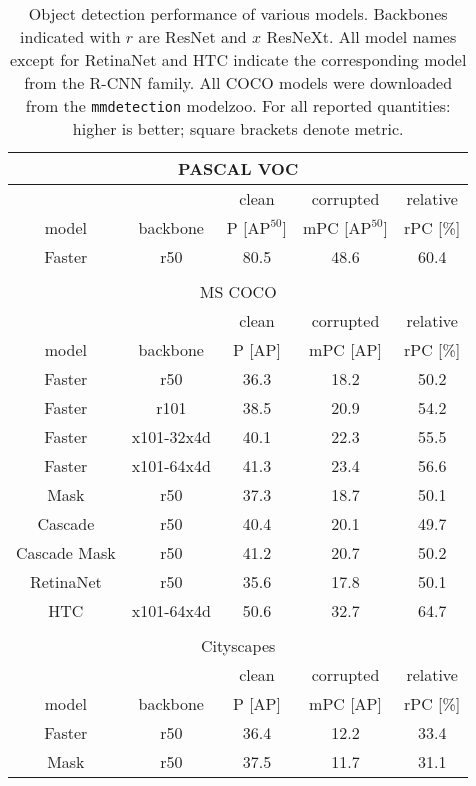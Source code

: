 \documentclass{article}
\begin{document}
\begin{table}[t!]\footnotesize
\begin{center}
\begin{tabular}{c|c|ccc}
\multicolumn{5}{c}{PASCAL VOC} \\
\toprule
\multicolumn{2}{c}{} & clean & corrupted & relative\\
model & backbone & P [$\operatorname{AP^{50}}$] & mPC [$\operatorname{AP^{50}}$]& rPC \small{[\%]}\\
\hline
Faster & r50 & 80.5 & 48.6 & 60.4\\
\bottomrule

\multicolumn{5}{c}{} \\
\multicolumn{5}{c}{MS COCO} \\
\toprule
\multicolumn{2}{c}{} & clean & corrupted & relative\\
model & backbone & P \small{[AP]} & mPC \small{[AP]} & rPC \small{[\%]}\\
\hline
Faster & r50 & 36.3 & 18.2 & 50.2\\
Faster & r101 & 38.5 & 20.9 & 54.2\\
Faster & x101-32x4d & 40.1 & 22.3 & 55.5\\
Faster & x101-64x4d & 41.3 & 23.4 & 56.6\\
\hline
Mask & r50 & 37.3 & 18.7 & 50.1\\
Cascade & r50 & 40.4 & 20.1 & 49.7\\
Cascade Mask & r50 & 41.2 & 20.7 & 50.2\\
RetinaNet & r50 & 35.6 & 17.8 & 50.1\\
HTC & x101-64x4d & 50.6 & 32.7 & 64.7\\
\bottomrule

\multicolumn{5}{c}{} \\
\multicolumn{5}{c}{Cityscapes}\\
\toprule
\multicolumn{2}{c}{} & clean & corrupted & relative\\
model & backbone & P \small{[AP]} & mPC \small{[AP]} & rPC \small{[\%]}\\
\hline
Faster & r50 & 36.4 & 12.2 & 33.4\\
Mask & r50 & 37.5 & 11.7 & 31.1\\
\bottomrule
\end{tabular}
\caption{Object detection performance of various models. Backbones indicated with $r$ are ResNet and $x$ ResNeXt. All model names except for  RetinaNet and HTC indicate the corresponding model from the R-CNN family.  All COCO models were downloaded from the \texttt{mmdetection} modelzoo. For all reported quantities: higher is better; square brackets denote metric.}
\label{table:results_corruption_benchmark}
\vspace{-1.0cm}
\end{center}
\end{table}
\end{document}
